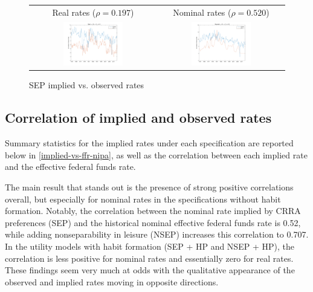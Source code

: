 \begin{figure}[t]
\centering
\begin{tabular}{cc} \\
Real rates ($\rho = 0.197$) & Nominal rates ($\rho = 0.520$) \\
\includegraphics[width=0.49\textwidth]{figs/nipa/implied-vs-ffr/real_sep} &
\includegraphics[width=0.49\textwidth]{figs/nipa/implied-vs-ffr/nominal_sep}
\end{tabular}
\caption{SEP implied vs. observed rates}
\label{implied-vs-ffr-nipa-sep}
\end{figure}



\subsection{Correlation of implied and observed rates}
Summary statistics for the implied rates under each specification are reported below in \autoref{implied-vs-ffr-nipa}, as well as the correlation between each implied rate and the effective federal funds rate.

The main result that stands out is the presence of strong positive correlations overall, but especially for nominal rates in the specifications without habit formation. Notably, the correlation between the nominal rate implied by CRRA preferences (SEP) and the historical nominal effective federal funds rate is 0.52, while adding nonseparability in leisure (NSEP) increases this correlation to 0.707. In the utility models with habit formation (SEP + HP and NSEP + HP), the correlation is less positive for nominal rates and essentially zero for real rates. These findings seem very much at odds with the qualitative appearance of the observed and implied rates moving in opposite directions.

